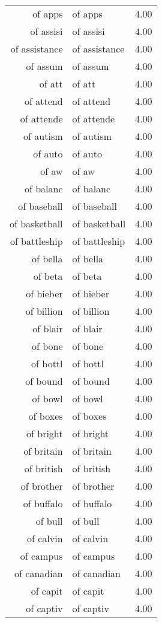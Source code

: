 \begin{table}[ht]
\begin{tabular}{rlr}
  of apps & of apps & 4.00 \\ 
  of assisi & of assisi & 4.00 \\ 
  of assistance & of assistance & 4.00 \\ 
  of assum & of assum & 4.00 \\ 
  of att & of att & 4.00 \\ 
  of attend & of attend & 4.00 \\ 
  of attende & of attende & 4.00 \\ 
  of autism & of autism & 4.00 \\ 
  of auto & of auto & 4.00 \\ 
  of aw & of aw & 4.00 \\ 
  of balanc & of balanc & 4.00 \\ 
  of baseball & of baseball & 4.00 \\ 
  of basketball & of basketball & 4.00 \\ 
  of battleship & of battleship & 4.00 \\ 
  of bella & of bella & 4.00 \\ 
  of beta & of beta & 4.00 \\ 
  of bieber & of bieber & 4.00 \\ 
  of billion & of billion & 4.00 \\ 
  of blair & of blair & 4.00 \\ 
  of bone & of bone & 4.00 \\ 
  of bottl & of bottl & 4.00 \\ 
  of bound & of bound & 4.00 \\ 
  of bowl & of bowl & 4.00 \\ 
  of boxes & of boxes & 4.00 \\ 
  of bright & of bright & 4.00 \\ 
  of britain & of britain & 4.00 \\ 
  of british & of british & 4.00 \\ 
  of brother & of brother & 4.00 \\ 
  of buffalo & of buffalo & 4.00 \\ 
  of bull & of bull & 4.00 \\ 
  of calvin & of calvin & 4.00 \\ 
  of campus & of campus & 4.00 \\ 
  of canadian & of canadian & 4.00 \\ 
  of capit & of capit & 4.00 \\ 
  of captiv & of captiv & 4.00 \\ 

\end{tabular}
\end{table}
